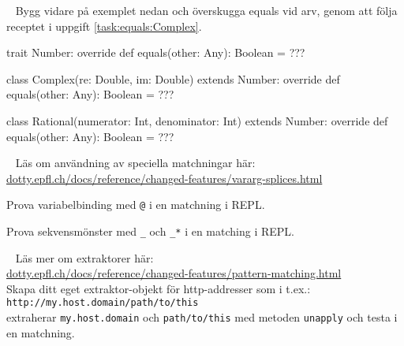 \SOLUTION


\TaskSolved \what



\QUESTEND







\QUESTBEGIN

\Task  \what~ Bygg vidare på exemplet nedan och överskugga equals vid arv, genom att följa receptet i uppgift \ref{task:equals:Complex}.
\begin{Code}
trait Number:
  override def equals(other: Any): Boolean = ???

class Complex(re: Double, im: Double) extends Number:
  override def equals(other: Any): Boolean = ???

class Rational(numerator: Int, denominator: Int) extends Number:
  override def equals(other: Any): Boolean = ???
\end{Code}


\SOLUTION


\TaskSolved \what



\QUESTEND







\QUESTBEGIN

\Task  \what~ Läs om användning av speciella matchningar här: \\
\href{https://dotty.epfl.ch/docs/reference/changed-features/vararg-splices.html}{dotty.epfl.ch/docs/reference/changed-features/vararg-splices.html}

\Subtask Prova variabelbinding med \texttt{@} i en matchning i REPL.

\Subtask Prova sekvensmönster med \texttt{\_} och \texttt{\_*} i en matching i REPL.

\SOLUTION


\TaskSolved \what \TODO



\QUESTEND







\QUESTBEGIN

\Task \label{task:extractor} \what~  Läs mer om extraktorer här: \\ \href{https://dotty.epfl.ch/docs/reference/changed-features/pattern-matching.html}{dotty.epfl.ch/docs/reference/changed-features/pattern-matching.html} \\
Skapa ditt eget extraktor-objekt för http-addresser som i t.ex.: \\
\texttt{http://my.host.domain/path/to/this} \\ extraherar \texttt{my.host.domain} och \texttt{path/to/this} med metoden \texttt{unapply} och testa i en matchning.


